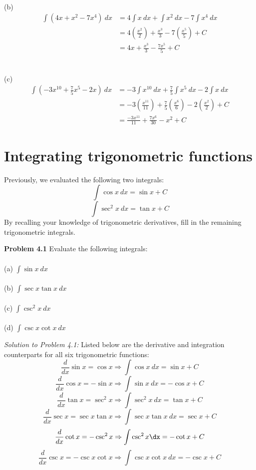 \documentclass[11pt]{scrartcl}
\begin{document}
\\
\noindent 
(b) 
\begin{align*}
    \int{(4x+x^2-7x^4)} \ dx &= 4\int{x} \ dx+\int x^2 \ dx-7\int x^4 \ dx \\
                             &= 4\left(\frac{x^2}{2}\right)+\frac{x^3}{3}-7\left(\frac{x^5}{5}\right) +C\\
                            &=                4x+\frac{x^3}{3}-\frac{7x^5}{5}+C
\end{align*}\\
\noindent\\
(c) 
\begin{align*}
    \int{(-3x^{10}+\frac{7}{5}x^5-2x) \ dx} &= -3\int{x^{10}} \ dx +\frac{7}{5}\int{x^5} \ dx-2\int{x} \ dx \\
                                            &= -3\left(\frac{x^{11}}{11}\right)+\frac{7}{5}\left(\frac{x^6}{6}\right)-2\left(\frac{x^2}{2}\right)+C \\
                                            &= \frac{-3x^{11}}{11}+\frac{7x^6}{30}-x^2+C
\end{align*}
\section{Integrating trigonometric functions} 
\noindent 
Previously, we evaluated the following two integrals: 
$$\int{\cos x \ dx}=\sin x +C$$
$$\int{\sec ^2 x} \ dx=\tan x +C$$
\noindent 
By recalling your knowledge of trigonometric derivatives, fill in the remaining trigonometric integrals. 
\begin{tcolorbox}[colback=purple!5!white,colframe=purple!75!black]
\textbf{Problem 4.1} Evaluate the following integrals: \\
\\
\noindent 
(a) \;\; $\int{\sin x}\ dx$ \\
\\
\noindent 
(b) \;\; $\int{\sec x \tan x \ dx}$ \\
\\
\noindent 
(c) \;\; $\int{\csc ^2 x} \ dx$ \\
\\
\noindent
(d) \;\; $\int \csc x \cot x\ dx$ 
\end{tcolorbox}
\noindent 
\textit{Solution to Problem 4.1:} Listed below are the derivative and integration counterparts for all six trigonometric functions: 
$$\frac{d}{dx}\sin x=\cos x \Rightarrow \int{\cos x \ dx}=\sin x + C$$
$$\frac{d}{dx}\cos x=-\sin x \Rightarrow \int{\sin x \ dx}=-\cos x + C$$
$$\frac{d}{dx} \tan x=\sec ^2 x \Rightarrow \int{\sec ^2 x \ dx}=\tan x + C$$
$$\frac{d}{dx} \sec x=\sec x \tan x \Rightarrow \int{\sec x \tan x \ dx}=\sec x + C$$
$$\frac{d}{dx} \cot x=-\csc ^2 x \Rightarrow \int{\csc ^2 x \dx } =-\cot x + C$$
$$\frac{d}{dx} \csc x=-\csc x \cot x \Rightarrow \int{\csc x \cot x \ dx}=-\csc x + C$$
\end{document}
